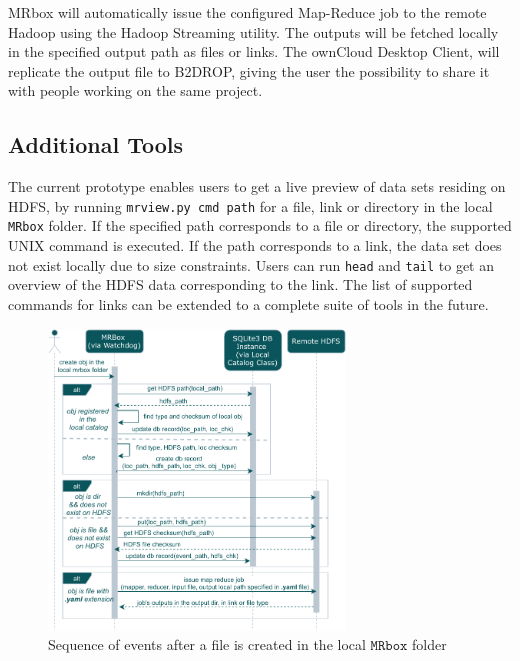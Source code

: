 MRbox will automatically issue the configured Map-Reduce job to the remote Hadoop using the Hadoop Streaming utility. The outputs will be fetched locally in the specified output path as files or links. The ownCloud Desktop Client, will replicate the output file to B2DROP, giving the user the possibility to share it with people working on the same project.

\subsection{Additional Tools}
The current prototype enables users to get a live preview of data sets residing on HDFS, by running \texttt{mrview.py cmd path} for a file, link or directory in the local \texttt{MRbox} folder. If the specified path corresponds to a file or directory, the supported UNIX command is executed. If the path corresponds to a link, the data set does not exist locally due to size constraints. Users can run \texttt{head} and \texttt{tail} to get an overview of the HDFS data corresponding to the link. The list of supported commands for links can be extended to a complete suite of tools in the future.

\begin{figure}
  \centering
  \includegraphics[width=\linewidth, height=8cm]{on_created_seq_sys.pdf}
  \caption{Sequence of events after a file is created in the local $\texttt{MRbox}$ folder}
\end{figure}


